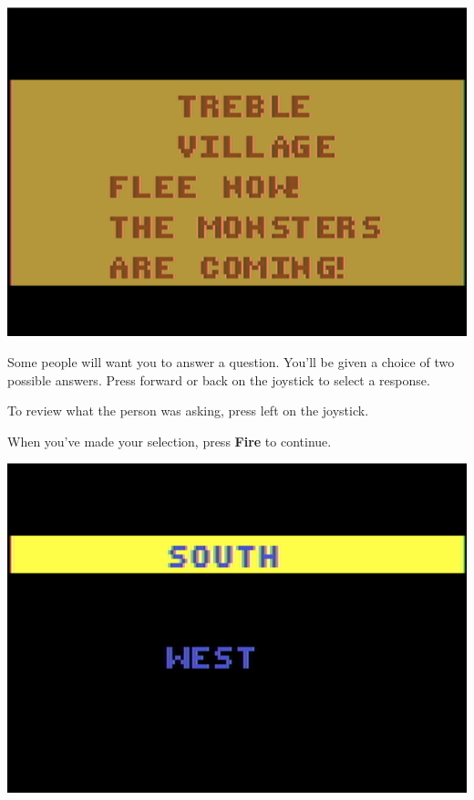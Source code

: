 \documentclass[10pt,twocolumn,openany,article]{memoir}
\begin{document}
\begin{center}
  \includegraphics[width=\columnwidth]{../Manual/TextNTSC.png}
\end{center}

Some people will want you to answer a question. You'll be given a choice
of two possible answers. Press forward or back on the joystick to select
a response.

To review  what  the  person  was  asking, press  left  on
the joystick.

When you've made your selection, press \textbf{Fire} to continue.

\begin{center}
  \includegraphics[width=\columnwidth]{../Manual/InquireNTSC.png}
\end{center}
\end{document}
